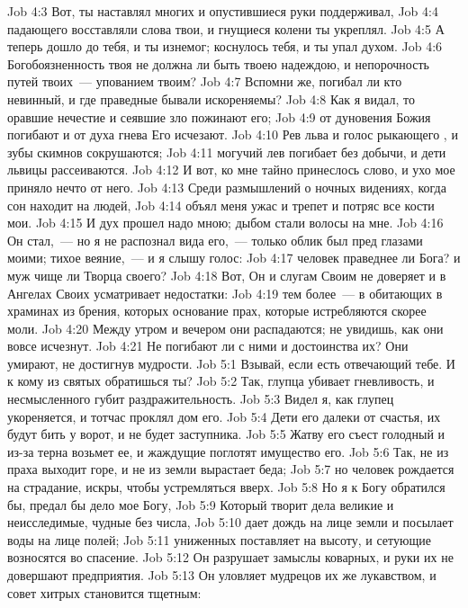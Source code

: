 \vs Job 4:3 Вот, ты наставлял многих и опустившиеся руки поддерживал,
\vs Job 4:4 падающего восставляли слова твои, и гнущиеся колени ты укреплял.
\vs Job 4:5 А теперь дошло до тебя, и ты изнемог; коснулось тебя, и ты упал духом.
\vs Job 4:6 Богобоязненность твоя не должна ли быть твоею надеждою, и непорочность путей твоих~--- упованием твоим?
\vs Job 4:7 Вспомни же, погибал ли кто невинный, и где праведные бывали искореняемы?
\vs Job 4:8 Как я видал, то оравшие нечестие и сеявшие зло пожинают его;
\vs Job 4:9 от дуновения Божия погибают и от духа гнева Его исчезают.
\vs Job 4:10 Рев льва и голос рыкающего , и зубы скимнов сокрушаются;
\vs Job 4:11 могучий лев погибает без добычи, и дети львицы рассеиваются.
\vs Job 4:12 И вот, ко мне тайно принеслось слово, и ухо мое приняло нечто от него.
\vs Job 4:13 Среди размышлений о ночных видениях, когда сон находит на людей,
\vs Job 4:14 объял меня ужас и трепет и потряс все кости мои.
\vs Job 4:15 И дух прошел надо мною; дыбом стали волосы на мне.
\vs Job 4:16 Он стал,~--- но я не распознал вида его,~--- только облик был пред глазами моими; тихое веяние,~--- и я слышу голос:
\vs Job 4:17 человек праведнее ли Бога? и муж чище ли Творца своего?
\vs Job 4:18 Вот, Он и слугам Своим не доверяет и в Ангелах Своих усматривает недостатки:
\vs Job 4:19 тем более~--- в обитающих в храминах из брения, которых основание прах, которые истребляются скорее моли.
\vs Job 4:20 Между утром и вечером они распадаются; не увидишь, как они вовсе исчезнут.
\vs Job 4:21 Не погибают ли с ними и достоинства их? Они умирают, не достигнув мудрости.
\vs Job 5:1 Взывай, если есть отвечающий тебе. И к кому из святых обратишься ты?
\vs Job 5:2 Так, глупца убивает гневливость, и несмысленного губит раздражительность.
\vs Job 5:3 Видел я, как глупец укореняется, и тотчас проклял дом его.
\vs Job 5:4 Дети его далеки от счастья, их будут бить у ворот, и не будет заступника.
\vs Job 5:5 Жатву его съест голодный и из-за терна возьмет ее, и жаждущие поглотят имущество его.
\vs Job 5:6 Так, не из праха выходит горе, и не из земли вырастает беда;
\vs Job 5:7 но человек рождается на страдание,  искры, чтобы устремляться вверх.
\vs Job 5:8 Но я к Богу обратился бы, предал бы дело мое Богу,
\vs Job 5:9 Который творит дела великие и неисследимые, чудные без числа,
\vs Job 5:10 дает дождь на лице земли и посылает воды на лице полей;
\vs Job 5:11 униженных поставляет на высоту, и сетующие возносятся во спасение.
\vs Job 5:12 Он разрушает замыслы коварных, и руки их не довершают предприятия.
\vs Job 5:13 Он уловляет мудрецов их же лукавством, и совет хитрых становится тщетным:

